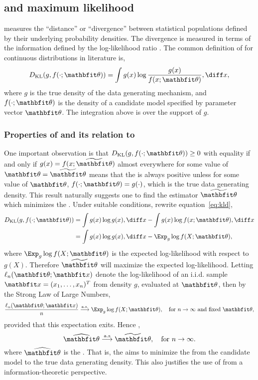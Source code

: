 \documentclass[10pt, hyper, bib, fontset=Lucida,
linespread=1.3, typearearatio=0.75]{marticle}
\begin{document}
\subsection{\kl and maximum likelihood}
\label{sub:kl and maximum likelihood}

\kl measures the ``distance'' or ``divergence'' between statistical
populations defined by their underlying probability densities. The divergence
is measured in terms of the information defined by the log-likelihood ratio
\parencite{Kullback:1951va}. The common definition of \kl for continuous
distributions in literature is,
\begin{equation}
  \dkl(g, f(\cdot;\bth)) = \int g(x)\log\frac{g(x)}{f(x;\bth)}\dd x,
  \label{eq:kld}
\end{equation}
where $g$ is the true density of the data generating mechanism, and
$f(\cdot;\bth)$ is the density of a candidate model specified by parameter
vector $\bth$. The integration above is over the support of $g$.

\subsubsection{Properties of \kl and its relation to \protect\mle}
\label{ssub:Properties of kl and its relation to mle}

One important observation is that $\dkl(g,f(\cdot;\bth))\ge0$ with equality if
and only if $g(x) = f(x;\tbth)$ almost everywhere for some value of $\bth =
\tbth$ %
means that the \kl is always positive unless for some value of $\bth$,
$f(\cdot;\bth) = g(\cdot)$, which is the true data generating density. This
result naturally suggests one to find the estimator $\tbth$ which minimizes
the \kl. Under suitable conditions, rewrite equation~\eqref{eq:kld},
\begin{align}
  \dkl(g,f(\cdot;\bth))
  & = \int g(x)\log g(x)\dd x - \int g(x)\log f(x;\bth)\dd x \notag\\
  & = \int g(x)\log g(x)\dd x - \Exp_g \log f(X;\bth),
  \label{eq:kl exp ll}
\end{align}
where $\Exp_g\log f(X;\bth)$ is the expected log-likelihood with respect to
$g(X)$. Therefore $\tbth$ will maximize the expected log-likelihood. Letting
$\ell_n(\bth;\bfx)$ denote the log-likelihood of an i.i.d. sample $\bfx =
(x_1,\dots,x_n)^T$ from density $g$, evaluated at $\bth$, then by the Strong
Law of Large Numbers,
\begin{equation}
  \frac{\ell_n(\bth;\bfx)}{n}
  \overset{\mathrm{a.s.}}{\longrightarrow}
  \Exp_g\log f(X;\bth), \quad\text{for } n\to\infty\text{ and fixed }\bth,
  \label{eq:kl consistency}
\end{equation}
provided that this expectation exits. Hence \parencite[see][for
details]{Kullback:1951va},
\begin{equation}
  \hbth \overset{\mathrm{a.s}}{\longrightarrow} \tbth,
  \quad\text{for } n\to\infty.
\end{equation}
where $\hbth$ is the \mle. That is, the \mle aims to minimize the \kl from the
candidate model to the true data generating density. This also justifies the
use of \mle from a information-theoretic perspective.
\end{document}
